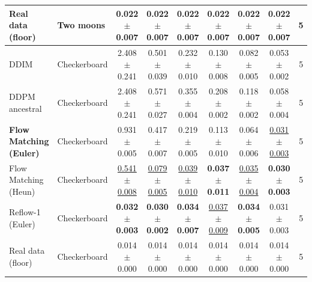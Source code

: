 \begin{tabular}{llccccccc}
Real data (floor) & Two moons & 0.022 $\pm$ 0.007 & 0.022 $\pm$ 0.007 & 0.022 $\pm$ 0.007 & 0.022 $\pm$ 0.007 & 0.022 $\pm$ 0.007 & 0.022 $\pm$ 0.007 & 5 \\
\midrule
DDIM & Checkerboard & 2.408 $\pm$ 0.241 & 0.501 $\pm$ 0.039 & 0.232 $\pm$ 0.010 & 0.130 $\pm$ 0.008 & 0.082 $\pm$ 0.005 & 0.053 $\pm$ 0.002 & 5 \\
DDPM ancestral & Checkerboard & 2.408 $\pm$ 0.241 & 0.571 $\pm$ 0.027 & 0.355 $\pm$ 0.004 & 0.208 $\pm$ 0.002 & 0.118 $\pm$ 0.002 & 0.058 $\pm$ 0.004 & 5 \\
\textbf{Flow Matching (Euler)} & Checkerboard & 0.931 $\pm$ 0.005 & 0.417 $\pm$ 0.007 & 0.219 $\pm$ 0.005 & 0.113 $\pm$ 0.010 & 0.064 $\pm$ 0.006 & \underline{0.031 $\pm$ 0.003} & 5 \\
Flow Matching (Heun) & Checkerboard & \underline{0.541 $\pm$ 0.008} & \underline{0.079 $\pm$ 0.005} & \underline{0.039 $\pm$ 0.010} & \textbf{0.037 $\pm$ 0.011} & \underline{0.035 $\pm$ 0.004} & \textbf{0.030 $\pm$ 0.003} & 5 \\
Reflow-1 (Euler) & Checkerboard & \textbf{0.032 $\pm$ 0.003} & \textbf{0.030 $\pm$ 0.002} & \textbf{0.034 $\pm$ 0.007} & \underline{0.037 $\pm$ 0.009} & \textbf{0.034 $\pm$ 0.005} & 0.031 $\pm$ 0.003 & 5 \\
Real data (floor) & Checkerboard & 0.014 $\pm$ 0.000 & 0.014 $\pm$ 0.000 & 0.014 $\pm$ 0.000 & 0.014 $\pm$ 0.000 & 0.014 $\pm$ 0.000 & 0.014 $\pm$ 0.000 & 5 \\
\bottomrule
\end{tabular}
